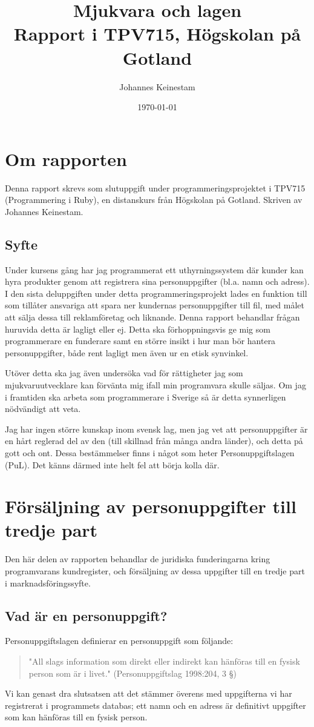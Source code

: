 \documentclass[12pt]{article}
\title{Mjukvara och lagen\large \\ Rapport i TPV715, Högskolan på Gotland}
\date{}
\begin{document}
	\author{Johannes Keinestam}
	\date{\today}
	\maketitle

	\section{Om rapporten}
	Denna rapport skrevs som slutuppgift under programmeringsprojektet i TPV715 (Programmering i Ruby), en distanskurs från Högskolan på Gotland. Skriven av Johannes Keinestam.

	\subsection{Syfte}
	Under kursens gång har jag programmerat ett uthyrningssystem där kunder kan hyra produkter genom att registrera sina personuppgifter (bl.a. namn och adress). I den sista deluppgiften under detta programmeringsprojekt lades en funktion till som tillåter ansvariga att spara ner kundernas personuppgifter till fil, med målet att sälja dessa till reklamföretag och liknande. Denna rapport behandlar frågan huruvida detta är lagligt eller ej. Detta ska förhoppningsvis ge mig som programmerare en funderare samt en större insikt i hur man bör hantera personuppgifter, både rent lagligt men även ur en etisk synvinkel.
	
	Utöver detta ska jag även undersöka vad för rättigheter jag som mjukvaruutvecklare kan förvänta mig ifall min programvara skulle säljas. Om jag i framtiden ska arbeta som programmerare i Sverige så är detta synnerligen nödvändigt att veta. 
	
	Jag har ingen större kunskap inom svensk lag, men jag vet att personuppgifter är en hårt reglerad del av den (till skillnad från många andra länder), och detta på gott och ont. Dessa bestämmelser finns i något som heter Personuppgiftslagen (PuL). Det känns därmed inte helt fel att börja kolla där.

	\section{Försäljning av personuppgifter till tredje part}
	Den här delen av rapporten behandlar de juridiska funderingarna kring programvarans kundregister, och försäljning av dessa uppgifter till en tredje part i marknadsföringssyfte.

 	 \subsection{Vad är en personuppgift?}
 	 Personuppgiftslagen definierar en personuppgift som följande:
		\begin{quotation}
		"All slags information som direkt eller indirekt kan hänföras till en fysisk person som är i livet." (Personuppgiftslag 1998:204, 3 §)\cite{pul}
		\end{quotation}
	Vi kan genast dra slutsatsen att det stämmer överens med uppgifterna vi har registrerat i programmets databas; ett namn och en adress är definitivt uppgifter som kan hänföras till en fysisk person. 
\end{document}
